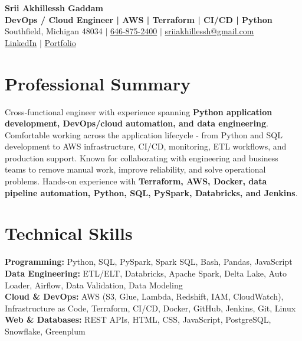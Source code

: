 \documentclass[letterpaper,10pt]{article}
\begin{document}
\fontsize{9.35pt}{10.45pt}\selectfont

\begin{center}
    {\LARGE \textbf{Srii Akhillessh Gaddam}} \\[-1pt]
    \textbf{DevOps / Cloud Engineer | AWS | Terraform | CI/CD | Python} \\[2pt]
    Southfield, Michigan 48034 $|$
    \href{tel:6468752400}{646-875-2400} $|$
    \href{mailto:sriiakhillessh@gmail.com}{sriiakhillessh@gmail.com} \\[1pt]
    \href{https://www.linkedin.com/in/srii-akhiilessh-gaddam-b48668191/}{LinkedIn} $|$
    \href{https://sriiakhillesshg.github.io/portfolio/}{Portfolio}
\end{center}
\vspace{-8pt}

\section{Professional Summary}
\small{Cross-functional engineer with experience spanning \textbf{Python application development, DevOps/cloud automation, and data engineering}. Comfortable working across the application lifecycle - from Python and SQL development to AWS infrastructure, CI/CD, monitoring, ETL workflows, and production support. Known for collaborating with engineering and business teams to remove manual work, improve reliability, and solve operational problems. Hands-on experience with \textbf{Terraform, AWS, Docker, data pipeline automation, Python, SQL, PySpark, Databricks, and Jenkins}.}

\section{Technical Skills}
\small{
\textbf{Programming:} Python, SQL, PySpark, Spark SQL, Bash, Pandas, JavaScript \\
\textbf{Data Engineering:} ETL/ELT, Databricks, Apache Spark, Delta Lake, Auto Loader, Airflow, Data Validation, Data Modeling \\
\textbf{Cloud \& DevOps:} AWS (S3, Glue, Lambda, Redshift, IAM, CloudWatch), Infrastructure as Code, Terraform, CI/CD, Docker, GitHub, Jenkins, Git, Linux \\
\textbf{Web \& Databases:} REST APIs, HTML, CSS, JavaScript, PostgreSQL, Snowflake, Greenplum
}
\end{document}
